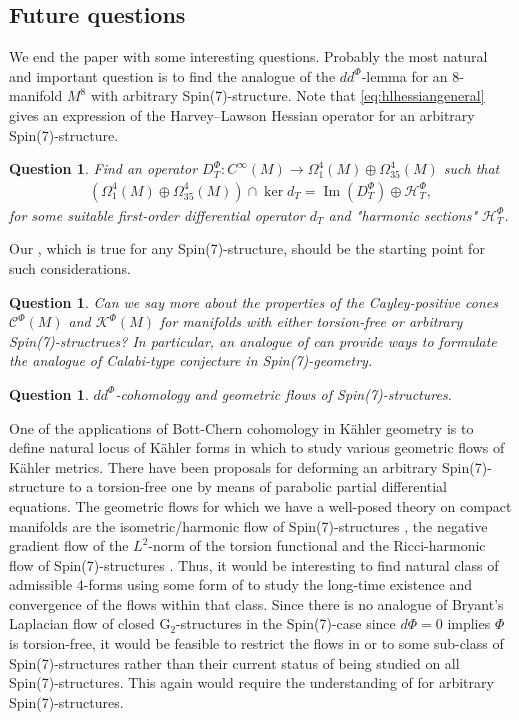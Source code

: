 \documentclass[10pt,a4paper,reqno]{article}
\newtheorem{question}[theorem]{Question}
\theoremstyle{definition}
\numberwithin{equation}{section}
\def\G2{\mathrm{G}_2}
\def\ddphi{dd^{\Phi}}
\def\cC{\mathcal{C}}
\def\cH{\mathcal{H}}
\def\cK{\mathcal{K}}
\DeclareMathOperator{\Ima}{Im}
\begin{document}
\subsection{Future questions}\label{subsec:futureques}
We end the paper with some interesting questions. Probably the most natural and important question is to find the analogue of the $\ddphi$-lemma for an $8$-manifold $M^8$ with arbitrary Spin(7)-structure. Note that \cref{eq:hlhessiangeneral} gives an expression of the Harvey--Lawson Hessian operator for an arbitrary Spin(7)-structure. 

\begin{question}
Find an operator $D^{\Phi}_T: C^{\infty}(M)\rightarrow \Omega^4_1(M)\oplus \Omega^4_{35}(M)$ such that
\begin{align*}
(\Omega^4_1(M)\oplus \Omega^4_{35}(M)) \cap \ker d_T = \Ima(D^{\Phi}_T)\oplus \cH^{\Phi}_T,
\end{align*}
for some suitable first-order differential operator $d_T$ and "harmonic sections" $\cH^{\Phi}_T$.
\end{question}
Our , which is true for any Spin(7)-structure, should be the starting point for such considerations.

\begin{question}
Can we say more about the properties of the Cayley-positive cones $\cC^{\Phi}(M)$ and $\cK^{\Phi}(M)$ for manifolds with either torsion-free or arbitrary Spin(7)-structrues? In particular, an analogue of  can provide ways to formulate the analogue of Calabi-type conjecture in Spin(7)-geometry.
\end{question}

\begin{question}
\emph{$\ddphi$-cohomology and geometric flows of Spin(7)-structures.}
\end{question}
One of the applications of Bott-Chern cohomology in K\"ahler geometry is to define natural locus of K\"ahler forms in which to study various geometric flows of K\"ahler metrics. There have been proposals for deforming an arbitrary Spin(7)-structure to a torsion-free one by means of parabolic partial differential equations. The geometric flows for which we have a well-posed theory on compact manifolds are the isometric/harmonic flow of Spin(7)-structures \cite{dle-isometric}, the negative gradient flow of the $L^2$-norm of the torsion functional \cite{Spin7-flow_Dwivedi} and the Ricci-harmonic flow of Spin(7)-structures \cite[]{dwivedi-rhf}. Thus, it would be interesting to find natural class of admissible $4$-forms using some form of  to study the long-time existence and convergence of the flows within that class. Since there is no analogue of Bryant's Laplacian flow of closed $\G2$-structures in the Spin(7)-case since $d\Phi=0$ implies $\Phi$ is torsion-free, it would be feasible to restrict the flows in \cite{Spin7-flow_Dwivedi} or \cite{dwivedi-rhf} to some sub-class of Spin(7)-structures rather than their current status of being studied on all Spin(7)-structures. This again would require the understanding of   for arbitrary Spin(7)-structures. 
\end{document}
